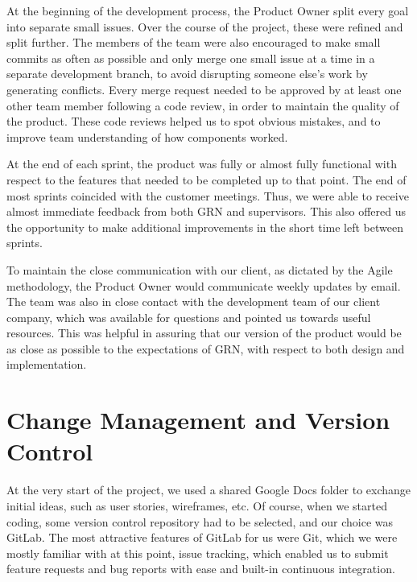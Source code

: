 \documentclass{l3proj}
\begin{document}
 

At the beginning of the development process, the Product Owner split
 every goal into separate small issues. Over the course of the project,
 these were refined and split further. The members of the team were
 also encouraged to make small commits as often as possible and only
 merge one small issue at a time in a separate development branch,
 to avoid disrupting someone else's work by generating conflicts.
 Every merge request needed to be approved by at least one other
 team member following a code review, in order to maintain the quality
 of the product. These code reviews helped us to spot obvious mistakes,
 and to improve team understanding of how components worked.

At the end of each sprint, the product was fully or almost fully
 functional with respect to the features that needed to be completed
 up to that point. The end of most sprints coincided with the customer
 meetings. Thus, we were able to receive almost immediate feedback
 from both GRN and supervisors. This also offered us the opportunity
 to make additional improvements in the short time left between sprints.

To maintain the close communication with our client, as dictated by
 the Agile methodology, the Product Owner would communicate weekly
 updates by email. The team was also in close contact with the
 development team of our client company, which was available
 for questions and pointed us towards useful resources. This
 was helpful in assuring that our version of the product would
 be as close as possible to the expectations of GRN, with respect
 to both design and implementation.

\section{Change Management and Version Control}
\label{sec:changemgmt}

At the very start of the project, we used a shared Google Docs folder
 to exchange initial ideas, such as user stories, wireframes, etc.
 Of course, when we started coding, some version control
 repository had to be selected, and our choice was GitLab.
 The most attractive features of GitLab for us were
 Git, which we were mostly familiar with at this point, issue
 tracking, which enabled us to submit feature requests and bug reports
 with ease and built-in continuous integration.
\end{document}
